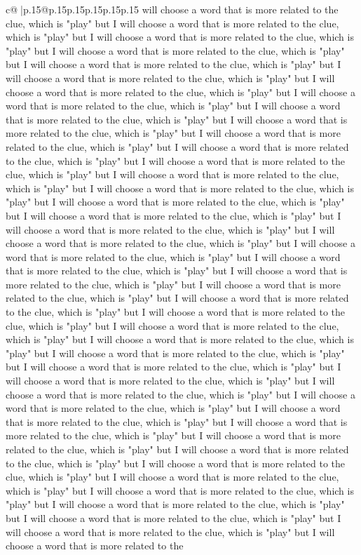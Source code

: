 \documentclass{article}
\begin{document}
{\begin{supertabular}{c@{$\;$}|p{.15\linewidth}@{}p{.15\linewidth}p{.15\linewidth}p{.15\linewidth}p{.15\linewidth}p{.15\linewidth}}
{{{will choose a word that is more related to the clue, which is "play" but I will choose a word that is more related to the clue, which is "play" but I will choose a word that is more related to the clue, which is "play" but I will choose a word that is more related to the clue, which is "play" but I will choose a word that is more related to the clue, which is "play" but I will choose a word that is more related to the clue, which is "play" but I will choose a word that is more related to the clue, which is "play" but I will choose a word that is more related to the clue, which is "play" but I will choose a word that is more related to the clue, which is "play" but I will choose a word that is more related to the clue, which is "play" but I will choose a word that is more related to the clue, which is "play" but I will choose a word that is more related to the clue, which is "play" but I will choose a word that is more related to the clue, which is "play" but I will choose a word that is more related to the clue, which is "play" but I will choose a word that is more related to the clue, which is "play" but I will choose a word that is more related to the clue, which is "play" but I will choose a word that is more related to the clue, which is "play" but I will choose a word that is more related to the clue, which is "play" but I will choose a word that is more related to the clue, which is "play" but I will choose a word that is more related to the clue, which is "play" but I will choose a word that is more related to the clue, which is "play" but I will choose a word that is more related to the clue, which is "play" but I will choose a word that is more related to the clue, which is "play" but I will choose a word that is more related to the clue, which is "play" but I will choose a word that is more related to the clue, which is "play" but I will choose a word that is more related to the clue, which is "play" but I will choose a word that is more related to the clue, which is "play" but I will choose a word that is more related to the clue, which is "play" but I will choose a word that is more related to the clue, which is "play" but I will choose a word that is more related to the clue, which is "play" but I will choose a word that is more related to the clue, which is "play" but I will choose a word that is more related to the clue, which is "play" but I will choose a word that is more related to the clue, which is "play" but I will choose a word that is more related to the clue, which is "play" but I will choose a word that is more related to the clue, which is "play" but I will choose a word that is more related to the clue, which is "play" but I will choose a word that is more related to the clue, which is "play" but I will choose a word that is more related to the clue, which is "play" but I will choose a word that is more related to the clue, which is "play" but I will choose a word that is more related to the clue, which is "play" but I will choose a word that is more related to the clue, which is "play" but I will choose a word that is more related to the clue, which is "play" but I will choose a word that is more related to the }}}
\end{supertabular}}
\end{document}
